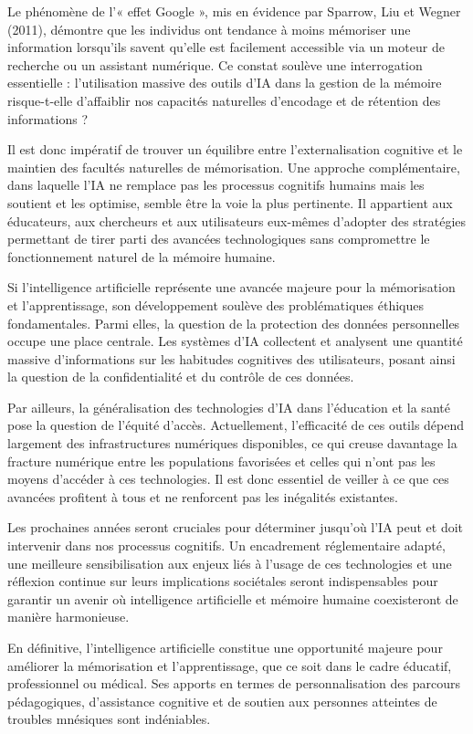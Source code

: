 \documentclass[12pt,a4paper]{report}
\begin{document}
Le phénomène de l’« effet Google », mis en évidence par Sparrow, Liu et Wegner (2011), démontre que les individus ont tendance à moins mémoriser une information lorsqu’ils savent qu’elle est facilement accessible via un moteur de recherche ou un assistant numérique. Ce constat soulève une interrogation essentielle : l’utilisation massive des outils d’IA dans la gestion de la mémoire risque-t-elle d’affaiblir nos capacités naturelles d’encodage et de rétention des informations ?

Il est donc impératif de trouver un équilibre entre l’externalisation cognitive et le maintien des facultés naturelles de mémorisation. Une approche complémentaire, dans laquelle l’IA ne remplace pas les processus cognitifs humains mais les soutient et les optimise, semble être la voie la plus pertinente. Il appartient aux éducateurs, aux chercheurs et aux utilisateurs eux-mêmes d’adopter des stratégies permettant de tirer parti des avancées technologiques sans compromettre le fonctionnement naturel de la mémoire humaine.

Si l’intelligence artificielle représente une avancée majeure pour la mémorisation et l’apprentissage, son développement soulève des problématiques éthiques fondamentales. Parmi elles, la question de la protection des données personnelles occupe une place centrale. Les systèmes d’IA collectent et analysent une quantité massive d’informations sur les habitudes cognitives des utilisateurs, posant ainsi la question de la confidentialité et du contrôle de ces données.

Par ailleurs, la généralisation des technologies d’IA dans l’éducation et la santé pose la question de l’équité d’accès. Actuellement, l’efficacité de ces outils dépend largement des infrastructures numériques disponibles, ce qui creuse davantage la fracture numérique entre les populations favorisées et celles qui n’ont pas les moyens d’accéder à ces technologies. Il est donc essentiel de veiller à ce que ces avancées profitent à tous et ne renforcent pas les inégalités existantes.

Les prochaines années seront cruciales pour déterminer jusqu’où l’IA peut et doit intervenir dans nos processus cognitifs. Un encadrement réglementaire adapté, une meilleure sensibilisation aux enjeux liés à l’usage de ces technologies et une réflexion continue sur leurs implications sociétales seront indispensables pour garantir un avenir où intelligence artificielle et mémoire humaine coexisteront de manière harmonieuse.

En définitive, l’intelligence artificielle constitue une opportunité majeure pour améliorer la mémorisation et l’apprentissage, que ce soit dans le cadre éducatif, professionnel ou médical. Ses apports en termes de personnalisation des parcours pédagogiques, d’assistance cognitive et de soutien aux personnes atteintes de troubles mnésiques sont indéniables.
\end{document}
